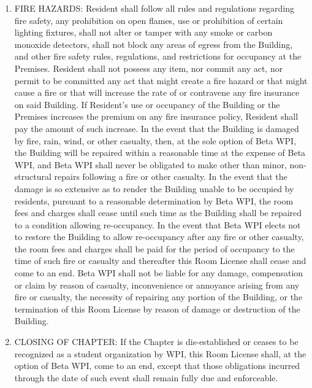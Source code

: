 \documentclass[legalpaper, 12pt]{article} \usepackage{lease}
\begin{document}
\begin{enumerate}
        \item FIRE HAZARDS: Resident shall follow all rules and regulations
                regarding fire safety, any prohibition on open flames, use or
                prohibition of certain lighting fixtures, shall not alter or
                tamper with any smoke or carbon monoxide detectors, shall not
                block any areas of egress from the Building, and other fire
                safety rules, regulations, and restrictions for occupancy at the
                Premises.  Resident shall not possess any item, nor commit any
                act, nor permit to be committed any act that might create a fire
                hazard or that might cause a fire or that will increase the rate
                of or contravene any fire insurance on said Building.  If
                Resident’s use or occupancy of the Building or the Premises
                increases the premium on any fire insurance policy, Resident
                shall pay the amount of such increase.  In the event that the
                Building is damaged by fire, rain, wind, or other casualty,
                then, at the sole option of Beta WPI, the Building will be
                repaired within a reasonable time at the expense of Beta WPI,
                and Beta WPI shall never be obligated to make other than minor,
                non-structural repairs following a fire or other casualty.  In
                the event that the damage is so extensive as to render the
                Building unable to be occupied by residents, pursuant to a
                reasonable determination by Beta WPI, the room fees and charges
                shall cease until such time as the Building shall be repaired to
                a condition allowing re-occupancy.  In the event that Beta WPI
                elects not to restore the Building to allow re-occupancy after
                any fire or other casualty, the room fees and charges shall be
                paid for the period of occupancy to the time of such fire or
                casualty and thereafter this Room License shall cease and come
                to an end. Beta WPI shall not be liable for any damage,
                compensation or claim by reason of casualty, inconvenience or
                annoyance arising from any fire or casualty, the necessity of
                repairing any portion of the Building, or the termination of
                this Room License by reason of damage or destruction of the
                Building.

        \item CLOSING OF CHAPTER: If the Chapter is dis-established or ceases to
                be recognized as a student organization by WPI, this Room
                License shall, at the option of Beta WPI, come to an end, except
                that those obligations incurred through the date of such event
                shall remain fully due and enforceable.


\end{enumerate}
\end{document}
